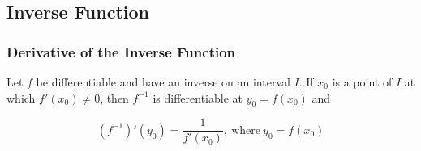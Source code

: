 \subsection{Inverse Function}
\subsubsection{Derivative of the Inverse Function}
Let $f$ be differentiable and have an inverse on an interval $I$. If $x_0$ is a point of $I$ at which $f'(x_0) \neq 0$, then $f^{-1}$ is differentiable at $y_0 = f(x_0)$ and

\begin{equation}
(f^{-1})'(y_0) = \frac{1}{f'(x_0)}, \ \text{where} \ y_0 = f(x_0)
\end{equation}
